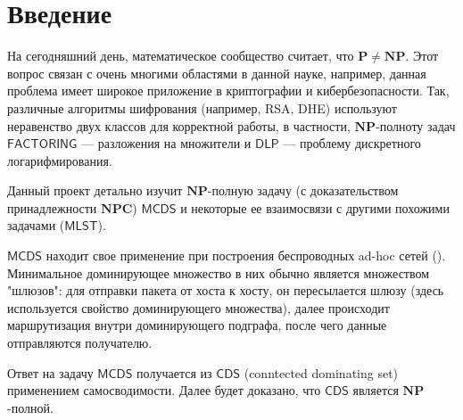 

\title{\GlobalTitle}
\author{Киселев Николай, Б05-424}


\maketitle

\begin{abstract}
    В данном проекте рассматривается задача \(\mathsf{MCDS}\) (minimum conntected dominating set --- минимальное связное доминирующее множество). Я разоберу связь данной задачи и \(\mathsf{MLST}\) (maximum leaf spanning tree --- остов с максимальным количеством листьев), приведу реализацию алгоритма её решения за \(O(1.9407^n)\), а также рассмотрю другие исследования, связанные с ней.
\end{abstract} 

\section{Введение}

На сегодняшний день, математическое сообщество считает, что \(\mathbf{P} \ne \mathbf{NP}\). Этот вопрос связан с очень многими областями в данной науке, например, данная проблема имеет широкое приложение в криптографии и кибербезопасности. Так, различные алгоритмы шифрования (например, RSA, DHE) используют неравенство двух классов для корректной работы, в частности, \(\mathbf{NP}\)-полноту задач \(\mathsf{FACTORING}\) --- разложения на множители и \(\mathsf{DLP}\) --- проблему дискретного логарифмирования.

Данный проект детально изучит \(\mathbf{NP}\)-полную задачу (с доказательством принадлежности \(\mathbf{NPC}\)) \(\mathsf{MCDS}\) и некоторые ее взаимосвязи с другими похожими задачами (\(\mathsf{MLST}\)).

\(\mathsf{MCDS}\) находит свое применение при построения беспроводных ad-hoc сетей (\cite{wu}). Минимальное доминирующее множество в них обычно является множеством "шлюзов": для отправки пакета от хоста к хосту, он пересылается шлюзу (здесь используется свойство доминирующего множества), далее происходит маршрутизация внутри доминирующего подграфа, после чего данные отправляются получателю.

Ответ на задачу \(\mathsf{MCDS}\) получается из \(\mathsf{CDS}\) (conntected dominating set) применением самосводимости. Далее будет доказано, что \(\mathsf{CDS}\) является \(\mathbf{NP}\)-полной.

